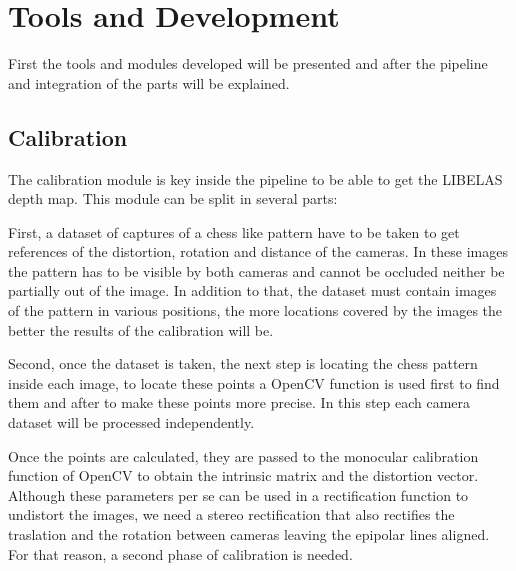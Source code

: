 \documentclass[10pt,a4paper,twocolumn,twoside]{article}
\begin{document}
	
	
	
	\section{Tools and Development}
	
	First the tools and modules developed will be presented and after the pipeline and integration of the parts will be explained. 
	
	\subsection{Calibration}
	\label{sec:calib}
	
	The calibration module is key inside the pipeline to be able to get the LIBELAS depth map. This module can be split in several parts:  
	
	First, a dataset of captures of a chess like pattern have to be taken to get references of the distortion, rotation and distance of the cameras. In these images the pattern has to be visible by both cameras and cannot be occluded neither be partially out of the image. In addition to that, the dataset must contain images of the pattern in various positions, the more locations covered by the images the better the results of the calibration will be. 
	
	Second, once the dataset is taken, the next step is locating the chess pattern inside each image, to locate these points a OpenCV function is used first to find them and after to make these points more precise. In this step each camera dataset will be processed independently. 
	
	Once the points are calculated, they are passed to the monocular calibration function of OpenCV to obtain the intrinsic matrix and the distortion vector.  Although these parameters per se can be used in a rectification function to undistort the images, we need a stereo rectification that also rectifies the traslation and the rotation between cameras leaving the epipolar lines aligned. For that reason, a second phase of calibration is needed. 
	
\end{document}
